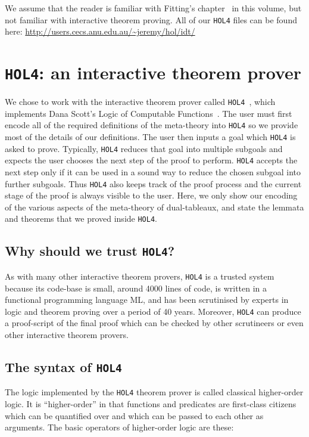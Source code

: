 \documentclass[a4paper]{article}
\newcommand{\hol}{\texttt{HOL4}}
\begin{document}
We assume that the reader is familiar with Fitting's
chapter~\cite{fitting-dual-tableau} in this volume, but not familiar
with interactive theorem proving. All of our \hol{} files can be found
here:
\url{http://users.cecs.anu.edu.au/~jeremy/hol/idt/}

\section{\hol: an interactive theorem prover}

We chose to work with the interactive theorem prover called
\hol~\cite{DBLP:conf/tphol/Gordon08}, which implements Dana Scott's
Logic of Computable Functions~\cite{scott-computable}. The user must
first encode all of the required definitions of the meta-theory into
\hol{} so we provide most of the details of our definitions. The user
then inputs a goal which \hol{} is asked to prove. Typically, \hol{}
reduces that goal into multiple subgoals and expects the user chooses
the next step of the proof to perform. \hol{} accepts the next step
only if it can be used in a sound way to reduce the chosen subgoal
into further subgoals. Thus \hol{} also keeps track of the proof
process and the current stage of the proof is always visible to the
user. Here, we only show our encoding of the various aspects of the
meta-theory of dual-tableaux, and state the lemmata and theorems that
we proved inside \hol.

\subsection{Why should we trust \hol?}

As with many other interactive theorem provers, \hol{} is a trusted
system because its code-base is small, around 4000 lines of
code, is written in a functional programming language ML, and has
been scrutinised by experts in logic and theorem proving over a period
of 40 years. Moreover, \hol{} can produce a proof-script of the final
proof which can be checked by other scrutineers or even other
interactive theorem provers.

\subsection{The syntax of \hol}

The logic implemented by the \hol{} theorem prover is called
classical higher-order logic. It is ``higher-order'' in that functions and
predicates are first-class citizens which can be quantified over and
which can be passed to each other as arguments. The basic operators of
higher-order logic are
these:
\end{document}
